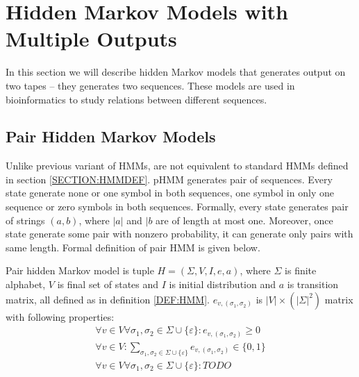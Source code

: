 

\section{Hidden Markov Models with Multiple Outputs}
In this section we will describe hidden Markov models that generates output on
two tapes -- they generates two sequences. These models are used in
bioinformatics to study relations between different sequences.

\subsection{Pair Hidden Markov Models}

Unlike previous variant of HMMs, 
are not equivalent to standard HMMs defined in section \ref{SECTION:HMMDEF}.
pHMM generates pair of sequences. Every state generate none or one symbol in
both sequences, one symbol in only one sequence or zero symbols in both
sequences. Formally, every state generates pair of strings $(a,b)$, where $|a|$
 and $|b$ are of length at most one.
Moreover, once state generate some pair with nonzero probability, it can
generate only pairs with same length. Formal definition of pair HMM is given
below.

\begin{definition}
Pair hidden Markov model is tuple $H=(\Sigma,V,I,e,a)$, where $\Sigma$ is finite
alphabet, $V$ is final set of states and $I$ is initial distribution and $a$ is
transition matrix, all defined as
in definition \ref{DEF:HMM}. $e_{v,(\sigma_1,\sigma_2)}$ is
$|V|\times\left(|\Sigma|^2\right)$ matrix with following properties:
\begin{align} 
\forall v\in V\forall \sigma_1,\sigma_2\in\Sigma\cup\{\varepsilon\}:
e_{v,(\sigma_1,\sigma_2)}\geq 0\\
\forall v\in V:
\sum_{\sigma_1,\sigma_2\in\Sigma\cup\{\varepsilon\}}e_{v,(\sigma_1,\sigma_2)}\in
\{0,1\}\\
\forall v\in V\forall \sigma_1,\sigma_2\in\Sigma\cup\{\varepsilon\}: TODO
\label{DEF:PAIRHMM:UNIQ}
\end{align}
\end{definition}

